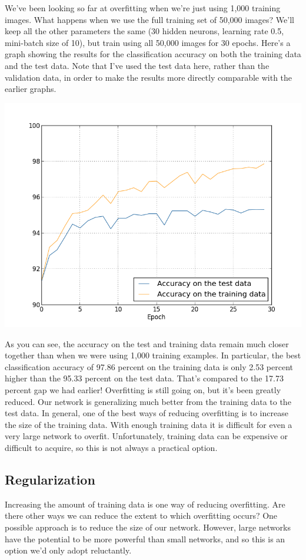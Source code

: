 \documentclass[a4paper,twoside,10pt]{book}
\begin{document}
We've been looking so far at overfitting when we're just using 1,000 training images. What happens when we use the full training set of 50,000 images? We'll keep all the other parameters the same (30 hidden neurons, learning rate 0.5, mini-batch size of 10), but train using all 50,000 images for 30 epochs. Here's a graph showing the results for the classification accuracy on both the training data and the test data. Note that I've used the test data here, rather than the validation data, in order to make the results more directly comparable with the earlier graphs.
\begin{center}
	\includegraphics[width=0.6\linewidth]{figures/ch3/overfitting_full}
\end{center}
As you can see, the accuracy on the test and training data remain much closer together than when we were using 1,000 training examples. In particular, the best classification accuracy of 97.86 percent on the training data is only 2.53 percent higher than the 95.33 percent on the test data. That's compared to the 17.73 percent gap we had earlier! Overfitting is still going on, but it's been greatly reduced. Our network is generalizing much better from the training data to the test data. In general, one of the best ways of reducing overfitting is to increase the size of the training data. With enough training data it is difficult for even a very large network to overfit. Unfortunately, training data can be expensive or difficult to acquire, so this is not always a practical option.

\subsection{Regularization}
\label{sec:3.2.1}
Increasing the amount of training data is one way of reducing overfitting. Are there other ways we can reduce the extent to which overfitting occurs? One possible approach is to reduce the size of our network. However, large networks have the potential to be more powerful than small networks, and so this is an option we'd only adopt reluctantly.
\end{document}
